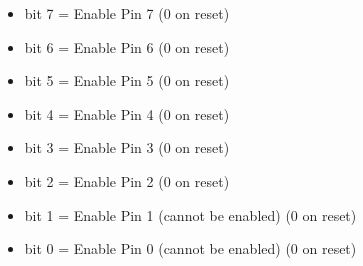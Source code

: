 \begin{itemize}
\item bit 7 = Enable Pin 7 (0 on reset)
\item bit 6 = Enable Pin 6 (0 on reset)
\item bit 5 = Enable Pin 5 (0 on reset)
\item bit 4 = Enable Pin 4 (0 on reset)
\item bit 3 = Enable Pin 3 (0 on reset)
\item bit 2 = Enable Pin 2 (0 on reset)
\item bit 1 = Enable Pin 1 (cannot be enabled) (0 on reset)
\item bit 0 = Enable Pin 0 (cannot be enabled) (0 on reset)
\end{itemize}

